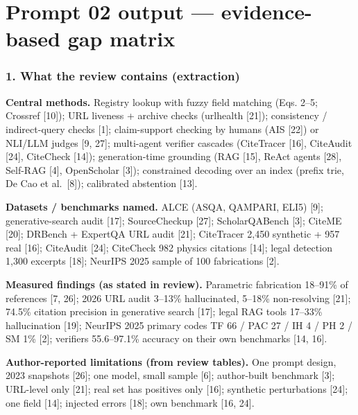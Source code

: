 \documentclass[
  10pt,
]{article}
\begin{document}
\newpage

\hypertarget{prompt-02-output-evidence-based-gap-matrix}{%
\section{Prompt 02 output --- evidence-based gap
matrix}\label{prompt-02-output-evidence-based-gap-matrix}}

\hypertarget{what-the-review-contains-extraction}{%
\subsubsection{1. What the review contains
(extraction)}\label{what-the-review-contains-extraction}}

\textbf{Central methods.} Registry lookup with fuzzy field matching
(Eqs. 2--5; Crossref {[}10{]}); URL liveness + archive checks (urlhealth
{[}21{]}); consistency / indirect-query checks {[}1{]}; claim-support
checking by humans (AIS {[}22{]}) or NLI/LLM judges {[}9, 27{]};
multi-agent verifier cascades (CiteTracer {[}16{]}, CiteAudit {[}24{]},
CiteCheck {[}14{]}); generation-time grounding (RAG {[}15{]}, ReAct
agents {[}28{]}, Self-RAG {[}4{]}, OpenScholar {[}3{]}); constrained
decoding over an index (prefix trie, De Cao et al.~{[}8{]}); calibrated
abstention {[}13{]}.

\textbf{Datasets / benchmarks named.} ALCE (ASQA, QAMPARI, ELI5)
{[}9{]}; generative-search audit {[}17{]}; SourceCheckup {[}27{]};
ScholarQABench {[}3{]}; CiteME {[}20{]}; DRBench + ExpertQA URL audit
{[}21{]}; CiteTracer 2,450 synthetic + 957 real {[}16{]}; CiteAudit
{[}24{]}; CiteCheck 982 physics citations {[}14{]}; legal detection
1,300 excerpts {[}18{]}; NeurIPS 2025 sample of 100 fabrications
{[}2{]}.

\textbf{Measured findings (as stated in review).} Parametric fabrication
18--91\% of references {[}7, 26{]}; 2026 URL audit 3--13\% hallucinated,
5--18\% non-resolving {[}21{]}; 74.5\% citation precision in generative
search {[}17{]}; legal RAG tools 17--33\% hallucination {[}19{]};
NeurIPS 2025 primary codes TF 66 / PAC 27 / IH 4 / PH 2 / SM 1\%
{[}2{]}; verifiers 55.6--97.1\% accuracy on their own benchmarks {[}14,
16{]}.

\textbf{Author-reported limitations (from review tables).} One prompt
design, 2023 snapshots {[}26{]}; one model, small sample {[}6{]};
author-built benchmark {[}3{]}; URL-level only {[}21{]}; real set has
positives only {[}16{]}; synthetic perturbations {[}24{]}; one field
{[}14{]}; injected errors {[}18{]}; own benchmark {[}16, 24{]}.
\end{document}
